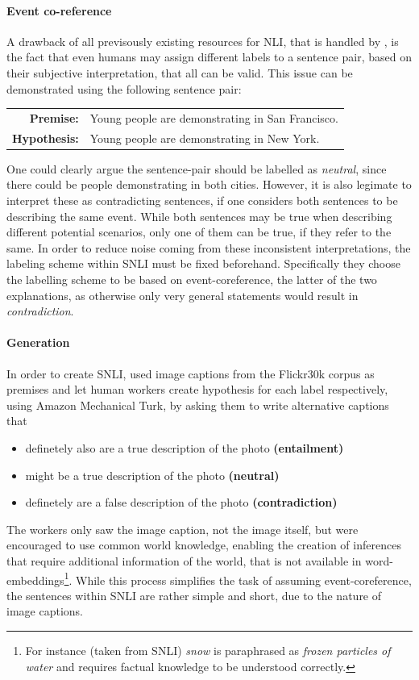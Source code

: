 \paragraph*{Event co-reference}
A drawback of all previsously existing resources for \ac{NLI}, that is handled by \cite{bowman2015large}, is the fact that even humans may assign different labels to a sentence pair, based on their subjective interpretation, that all can be valid. This issue can be demonstrated using the following sentence pair:
\begin{center}
\begin{tabular}{rl}
\textbf{Premise:} & Young people are demonstrating in San Francisco.
\\
\textbf{Hypothesis:} & Young people are demonstrating in New York.
\end{tabular}
\end{center}
One could clearly argue the sentence-pair should be labelled as \textit{neutral}, since there could be people demonstrating in both cities. However, it is also legimate to interpret these as contradicting sentences, if one considers both sentences to be describing the same event. While both sentences may be true when describing different potential scenarios, only one of them can be true, if they refer to the same. In order to reduce noise coming from these inconsistent interpretations, the labeling scheme within \ac{SNLI} must be fixed beforehand. Specifically they choose the labelling scheme to be based on event-coreference, the latter of the two explanations, as otherwise only very general statements would result in \textit{contradiction}.
\paragraph*{Generation}
In order to create \ac{SNLI}, \cite{bowman2015large} used image captions from the Flickr30k corpus \citep{young2014image} as premises and let human workers create hypothesis for each label respectively, using Amazon Mechanical Turk, by asking them to write alternative captions that
\begin{itemize}
\item definetely also are a true description of the photo  \textbf{(entailment)}
\item might be a true description of the photo \textbf{(neutral)}
\item definetely are a false description of the photo \textbf{(contradiction)}
\end{itemize}
The workers only saw the image caption, not the image itself, but were encouraged to use common world knowledge, enabling the creation of inferences that require additional information of the world, that is not available in word-embeddings\footnote{For instance (taken from \ac{SNLI}) \textit{snow} is paraphrased as \textit{frozen particles of water} and requires factual knowledge to be understood correctly.}. While this process simplifies the task of assuming event-coreference, the sentences within \ac{SNLI} are rather simple and short, due to the nature of image captions. 

